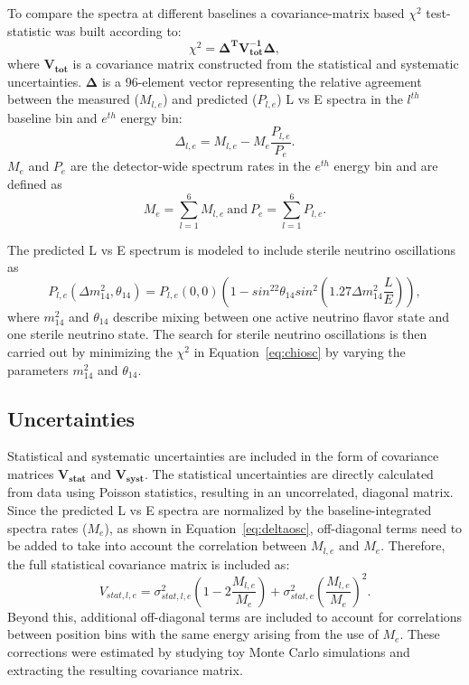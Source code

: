 To compare the spectra at different baselines a covariance-matrix based $\chi^2$ test-statistic was built according to:
\begin{equation}	
	\chi^2 = \mathbf{\Delta^TV^{-1}_{tot}\Delta},
	\label{eq:chiosc}
\end{equation}
where $\mathbf{V_{tot}}$ is a covariance matrix constructed from the statistical and systematic uncertainties.
$\mathbf{\Delta}$ is a 96-element vector representing the relative agreement between the measured ($M_{l,e}$) and predicted ($P_{l,e}$) L vs E spectra in the $l^{th}$ baseline bin and $e^{th}$ energy bin:
\begin{equation}
	\Delta_{l,e} = M_{l,e} - M_e\frac{P_{l,e}}{P_e}.
	\label{eq:deltaosc}
\end{equation}
$M_e$ and $P_e$ are the detector-wide spectrum rates in the $e^{th}$ energy bin and are defined as
\begin{equation}
	M_e = \sum_{l=1}^{6}M_{l,e}~\textrm{and}~P_e = \sum_{l=1}^{6}P_{l,e}.
\end{equation}

The predicted L vs E spectrum is modeled to include sterile neutrino oscillations as
\begin{equation}
	P_{l,e}(\Delta m_{14}^2,\theta_{14}) = P_{l,e}(0,0)\left(1-sin^22\theta_{14}sin^2\left(1.27\Delta m_{14}^2\frac{L}{E}   \right)\right),
\end{equation}
where $m_{14}^2$ and $\theta_{14}$ describe mixing between one active neutrino flavor state and one sterile neutrino state.
The search for sterile neutrino oscillations is then carried out by minimizing the $\chi^2$ in Equation~\ref{eq:chiosc} by varying the parameters $m_{14}^2$ and $\theta_{14}$.

\subsection{Uncertainties}

Statistical and systematic uncertainties are included in the form of covariance matrices $\mathbf{V_{stat}}$ and $\mathbf{V_{syst}}$.
The statistical uncertainties are directly calculated from data using Poisson statistics, resulting in an uncorrelated, diagonal matrix.
Since the predicted L vs E spectra are normalized by the baseline-integrated spectra rates ($M_e$), as shown in Equation~\ref{eq:deltaosc}, off-diagonal terms need to be added to take into account the correlation between $M_{l,e}$ and $M_e$.
Therefore, the full statistical covariance matrix is included as:
\begin{equation}
	V_{stat,l,e} = \sigma^2_{stat,l,e}\left(1-2\frac{M_{l,e}}{M_e}\right) + \sigma^2_{stat,e}\left(\frac{M_{l,e}}{M_e}\right)^2.
\end{equation}
Beyond this, additional off-diagonal terms are included to account for correlations between position bins with the same energy arising from the use of $M_e$.
These corrections were estimated by studying toy Monte Carlo simulations and extracting the resulting covariance matrix.

